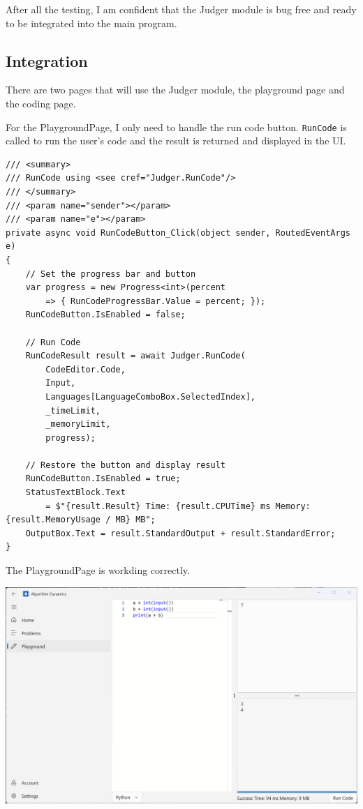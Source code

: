 \documentclass[a4paper]{report}
\newcommand{\code}{\texttt}
\begin{document}
After all the testing, I am confident that the Judger module is bug free and ready to be integrated into the main program.

\subsection{Integration}

There are two pages that will use the Judger module, the playground page and the coding page.

For the PlaygroundPage, I only need to handle the run code button. \code{RunCode} is called to run the user's code and the result is returned and displayed in the UI.

\begin{verbatim}
/// <summary>
/// RunCode using <see cref="Judger.RunCode"/>
/// </summary>
/// <param name="sender"></param>
/// <param name="e"></param>
private async void RunCodeButton_Click(object sender, RoutedEventArgs e)
{
    // Set the progress bar and button
    var progress = new Progress<int>(percent 
        => { RunCodeProgressBar.Value = percent; });
    RunCodeButton.IsEnabled = false;

    // Run Code
    RunCodeResult result = await Judger.RunCode(
        CodeEditor.Code,
        Input,
        Languages[LanguageComboBox.SelectedIndex],
        _timeLimit,
        _memoryLimit,
        progress);

    // Restore the button and display result
    RunCodeButton.IsEnabled = true;
    StatusTextBlock.Text 
        = $"{result.Result} Time: {result.CPUTime} ms Memory: {result.MemoryUsage / MB} MB";
    OutputBox.Text = result.StandardOutput + result.StandardError;
}
\end{verbatim}

The PlaygroundPage is workding correctly.

\includegraphics[width=\textwidth, height=\textheight, keepaspectratio]{PlaygroundPage-RunCode}
\end{document}
